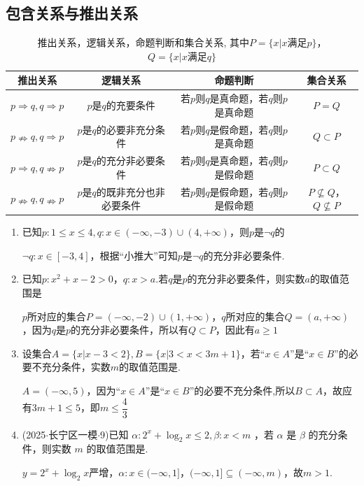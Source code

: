 \subsection*{包含关系与推出关系}
\begin{table}[h]
    \centering
    \begin{tabular}{|c|c|c|c|}
        \hline
        推出关系 & 逻辑关系 & 命题判断 & 集合关系 \\
        \hline
        $p \Rightarrow q, q \Rightarrow p$ & $p$是$q$的充要条件 & 若$p$则$q$是真命题，若$q$则$p$是真命题 & $P = Q$\\
        \hline
        $p \nRightarrow q, q \Rightarrow p$ & $p$是$q$的必要非充分条件 & 若$p$则$q$是假命题，若$q$则$p$是真命题 & $Q \subset P$ \\
        \hline
        $p \Rightarrow q, q \nRightarrow p$ & $p$是$q$的充分非必要条件 & 若$p$则$q$是真命题，若$q$则$p$是假命题 & $P \subset Q$ \\
        \hline
        $p \nRightarrow q, q \nRightarrow p$ & $p$是$q$的既非充分也非必要条件 & 若$p$则$q$是假命题，若$q$则$p$是假命题 & $P \not\subseteq Q$，$Q \not\subseteq P$\\
        \hline
    \end{tabular}
    \caption{推出关系，逻辑关系，命题判断和集合关系, 其中$P = \{x|x\mbox{满足}p\}$，$Q = \{x|x\mbox{满足}q\}$}
\end{table}
\begin{enumerate}
    \item 已知$p: 1 \leq x \leq 4, q: x \in (-\infty, -3) \cup (4, +\infty)$，则$p$是$\neg{q}$的
    \begin{jieda}
        $\neg{q}: x \in [-3, 4]$，根据“小推大”可知$p$是$\neg{q}$的充分非必要条件.
    \end{jieda}
    \item 已知$p: x^2 +x - 2 > 0$，$q: x > a$.若$q$是$p$的充分非必要条件，则实数$a$的取值范围是\blkda{$[1, +\infty)$}
    \begin{jieda}
        $p$所对应的集合$P = (-\infty, -2) \cup (1, +\infty)$，$q$所对应的集合$Q = (a, +\infty)$，因为$q$是$p$的充分非必要条件，所以有$Q \subset P$，因此有$a \geq 1$
    \end{jieda}
    \item 设集合$A = \{x | x-3 < 2\}, B = \{x |3 < x < 3m+1\}$，若“$x \in A$”是“$x \in B$”的必要不充分条件，实数$m$的取值范围是\blkda{$\left(-\infty, \dfrac{4}{3}\right]$}.
    \begin{jieda}
        $A = (-\infty, 5)$，因为“$x \in A$”是“$x \in B$”的必要不充分条件,所以$B \subset A$，故应有$3m+1 \leq 5$，即$m \leq \dfrac{4}{3}$
    \end{jieda}
    \item (2025$\cdot$长宁区一模$\cdot$9)已知 $\alpha  : {2}^{x} + {\log }_{2}x \leq  2,\beta  : x < m$ ，若 $\alpha$ 是 $\beta$ 的充分条件，则实数 $m$ 的取值范围是.
    \begin{jieda}
        $y = {2}^{x} + {\log }_{2}x$严增，$\alpha : x \in (-\infty, 1]$，$(-\infty, 1] \subseteq (-\infty, m)$，故$m > 1$.
    \end{jieda}
\end{enumerate}
